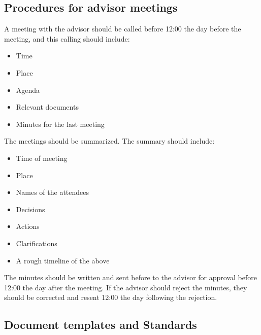 \subsection{Procedures for advisor meetings}
A meeting with the advisor should be called before 12:00 the day before the meeting, and this calling should include:
\begin{itemize}
	\item Time
	\item Place
	\item Agenda
	\item Relevant documents
	\item Minutes for the last meeting
\end{itemize}
The meetings should be summarized. The summary should include:
\begin{itemize}
	\item Time of meeting
	\item Place
	\item Names of the attendees
	\item Decisions
	\item Actions
	\item Clarifications
	\item A rough timeline of the above
\end{itemize}
The minutes should be written and sent before to the advisor for approval before 12:00 the day after the meeting. If the advisor should reject the minutes, they should be corrected and resent 12:00 the day following the rejection.

\subsection{Document templates and Standards}

